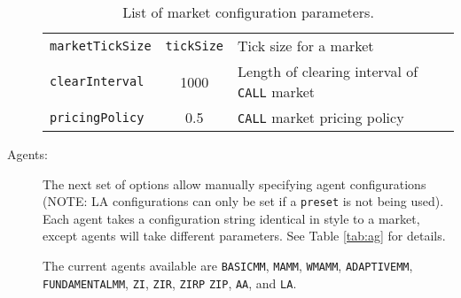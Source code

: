 \documentclass[11pt]{article}
\begin{document}
\begin{description}
\begin{table}
\begin{tabular}[f]{p{} c p{}}
\verb|marketTickSize|		& \verb|tickSize| & Tick size for a market \\

\verb|clearInterval| 		& 1000 & Length of clearing interval of \verb|CALL| market \\
\verb|pricingPolicy|			& 0.5 & \verb|CALL| market pricing policy

\end{tabular}
\caption{List of market configuration parameters.}
\label{tab:mkt}
\end{table}

\item[Agents:] The next set of options allow manually specifying agent
  configurations (NOTE: LA configurations can only be set if a \texttt{preset} is not being used). 
   Each agent takes a configuration string identical in style to a market, except agents
  will take different parameters. See Table \ref{tab:ag} for details.
  
  The current agents available are \texttt{BASICMM}, \texttt{MAMM}, \texttt{WMAMM}, \texttt{ADAPTIVEMM}, \texttt{FUNDAMENTALMM},
  \texttt{ZI}, \texttt{ZIR}, \texttt{ZIRP} \texttt{ZIP}, \texttt{AA}, and \texttt{LA}.
  

\end{description}
\end{document}
